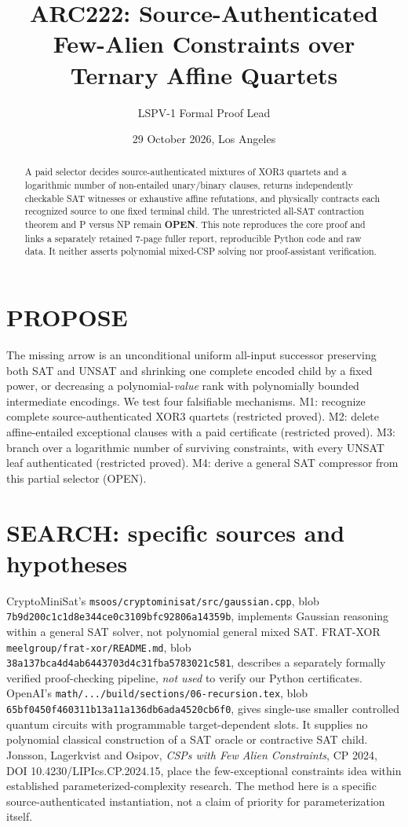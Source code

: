 \documentclass[11pt]{article}
\title{ARC222: Source-Authenticated Few-Alien Constraints over Ternary Affine Quartets}
\author{LSPV-1 Formal Proof Lead}
\date{29 October 2026, Los Angeles}
\begin{document}
\maketitle
\begin{abstract}
A paid selector decides source-authenticated mixtures of XOR3 quartets and
a logarithmic number of non-entailed unary/binary clauses, returns independently
checkable SAT witnesses or exhaustive affine refutations, and physically contracts
each recognized source to one fixed terminal child.  The unrestricted all-SAT
contraction theorem and P versus NP remain \textbf{OPEN}.
This note reproduces the core proof and links a separately retained 7-page
fuller report, reproducible Python code and raw data. It neither asserts
polynomial mixed-CSP solving nor proof-assistant verification.
\end{abstract}
\section{PROPOSE}
The missing arrow is an unconditional uniform all-input successor preserving
both SAT and UNSAT and shrinking one complete encoded child by a fixed
power, or decreasing a polynomial-\emph{value} rank with polynomially bounded
intermediate encodings.  We test four falsifiable mechanisms.
M1: recognize complete source-authenticated XOR3 quartets (restricted proved).
M2: delete affine-entailed exceptional clauses with a paid certificate
(restricted proved). M3: branch over a logarithmic number of surviving
constraints, with every UNSAT leaf authenticated (restricted proved).
M4: derive a general SAT compressor from this partial selector (OPEN).
\section{SEARCH: specific sources and hypotheses}
CryptoMiniSat's \texttt{msoos/cryptominisat/src/gaussian.cpp},
blob \texttt{7b9d200c1c1d8e344ce0c3109bfc92806a14359b}, implements
Gaussian reasoning within a general SAT solver, not polynomial general
mixed SAT. FRAT-XOR \texttt{meelgroup/frat-xor/README.md}, blob
\texttt{38a137bca4d4ab6443703d4c31fba5783021c581}, describes
a separately formally verified proof-checking pipeline, \emph{not used}
to verify our Python certificates.  OpenAI's
\texttt{math/.../build/sections/06-recursion.tex}, blob
\texttt{65bf0450f460311b13a11a136db6ada4520cb6f0}, gives
single-use smaller controlled quantum circuits with programmable
target-dependent slots. It supplies no polynomial classical construction
of a SAT oracle or contractive SAT child.
Jonsson, Lagerkvist and Osipov, \emph{CSPs with Few Alien Constraints},
CP 2024, DOI 10.4230/LIPIcs.CP.2024.15, place the few-exceptional
constraints idea within established parameterized-complexity research.
The method here is a specific source-authenticated instantiation,
not a claim of priority for parameterization itself.
\end{document}
